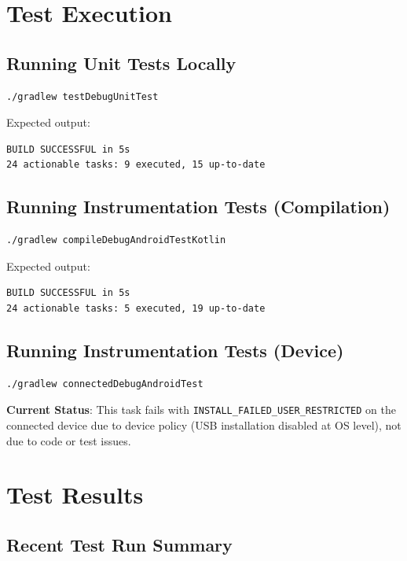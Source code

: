 \documentclass[12pt,a4paper]{article}
\begin{document}
\section{Test Execution}

\subsection{Running Unit Tests Locally}

\begin{verbatim}
./gradlew testDebugUnitTest
\end{verbatim}

Expected output:
\begin{verbatim}
BUILD SUCCESSFUL in 5s
24 actionable tasks: 9 executed, 15 up-to-date
\end{verbatim}

\subsection{Running Instrumentation Tests (Compilation)}

\begin{verbatim}
./gradlew compileDebugAndroidTestKotlin
\end{verbatim}

Expected output:
\begin{verbatim}
BUILD SUCCESSFUL in 5s
24 actionable tasks: 5 executed, 19 up-to-date
\end{verbatim}

\subsection{Running Instrumentation Tests (Device)}

\begin{verbatim}
./gradlew connectedDebugAndroidTest
\end{verbatim}

\textbf{Current Status}: This task fails with \texttt{INSTALL\_FAILED\_USER\_RESTRICTED} on the connected device due to device policy (USB installation disabled at OS level), not due to code or test issues.

\section{Test Results}

\subsection{Recent Test Run Summary}
\end{document}
